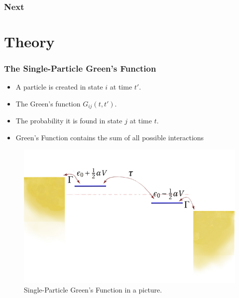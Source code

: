\begin{frame}
    \frametitle{Next}
\end{frame}
\section{Theory}
\begin{frame}
    \frametitle{The Single-Particle Green's Function}
     \begin{itemize}
     \item A particle is created in state $i$ at time $t'$.
     \item The Green's function $G_{ij}(t,t')$.
     \item The probability it is found in state $j$ at time $t$.
     \item Green's Function contains the sum of all possible interactions
     \end{itemize}
    
    \begin{figure}[!b] 
        \centering
        \includegraphics[height=0.5\textheight]{fig/non_interacting_schematics.pdf}
        \caption{Single-Particle Green's Function in a picture.}
    \end{figure} 
\end{frame} 
